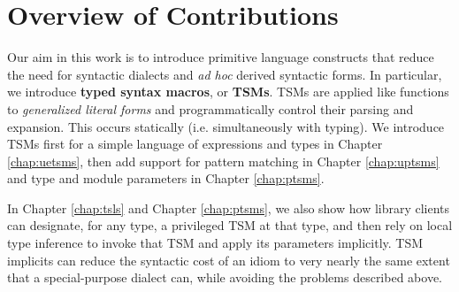 \section{Overview of Contributions}\label{sec:contributions}
Our aim in this work is to introduce primitive language constructs that reduce the need for syntactic dialects and \emph{ad hoc} derived syntactic forms. In particular, we introduce \textbf{typed syntax macros}, or \textbf{TSMs}. TSMs are applied like functions to \emph{generalized literal forms} and programmatically control their  parsing and expansion. This occurs statically (i.e. simultaneously with typing). We  introduce TSMs first for a simple language of expressions and types in Chapter \ref{chap:uetsms}, then add support for pattern matching  in Chapter \ref{chap:uptsms} and type and module parameters in Chapter \ref{chap:ptsms}.

In Chapter \ref{chap:tsls} and Chapter \ref{chap:ptsms}, we also show how library clients can designate, for any type, a privileged TSM at that type, and then rely on local type inference to invoke that TSM and apply its parameters implicitly. TSM implicits can reduce the syntactic cost of an idiom to very nearly the same extent that a special-purpose dialect can, while avoiding the problems described above.

